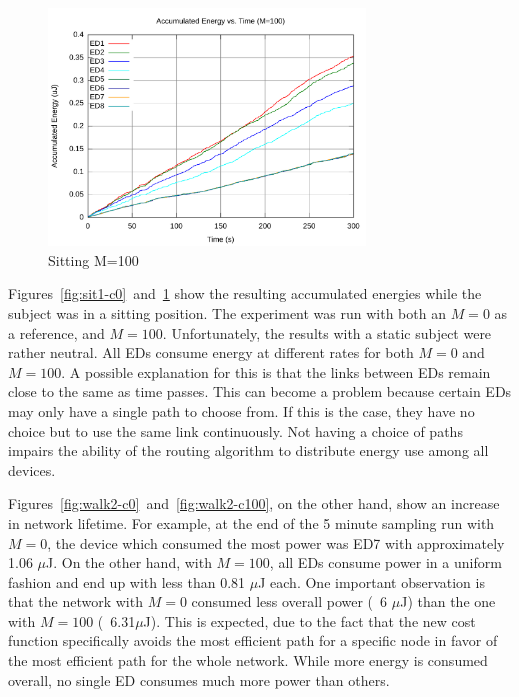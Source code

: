 \documentclass{article}
\begin{document}
\begin{figure}[!htb]
\begin{center}
\includegraphics[width=0.75\textwidth]{figures/sit1-c100.pdf}
\caption{Sitting M=100}
\label{fig:sit1-c100}
\end{center}
\end{figure}

Figures~\ref{fig:sit1-c0}~and~\ref{fig:sit1-c100} show the resulting accumulated energies while the subject was in a sitting position. The experiment was run with both an $M=0$ as a reference, and $M=100$. Unfortunately, the results with a static subject were rather neutral. All EDs consume energy at different rates for both $M=0$ and $M=100$. A possible explanation for this is that the links between EDs remain close to the same as time passes. This can become a problem because certain EDs may only have a single path to choose from. If this is the case, they have no choice but to use the same link continuously. Not having a choice of paths impairs the ability of the routing algorithm to distribute energy use among all devices.

Figures~\ref{fig:walk2-c0}~and~\ref{fig:walk2-c100}, on the other hand, show an increase in network lifetime. For example, at the end of the 5 minute sampling run with $M=0$, the device which consumed the most power was ED7 with approximately 1.06 $\mu$J. On the other hand, with $M=100$, all EDs consume power in a uniform fashion and end up with less than 0.81 $\mu$J each. One important observation is that the network with $M=0$ consumed less overall power (~6 $\mu$J) than the one with $M=100$ (~6.31$\mu$J). This is expected, due to the fact that the new cost function specifically avoids the most efficient path for a specific node in favor of the most efficient path for the whole network. While more energy is consumed overall, no single ED consumes much more power than others. 
\end{document}
